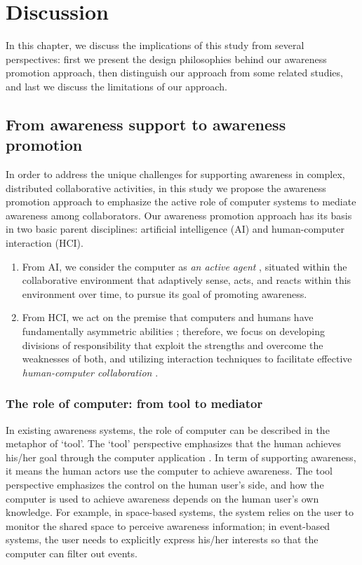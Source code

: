 \graphicspath{{Figures/}}

\chapter{Discussion} %
\label{cha:discussion}
In this chapter, we discuss the implications of this study from several perspectives: first we present the design philosophies behind our awareness promotion approach, then distinguish our approach from some related studies, and last we discuss the limitations of our approach.

\section{From awareness support to awareness promotion} %
\label{sec:from_awareness_support_to_awareness_promotion}
In order to address the unique challenges for supporting awareness in complex, distributed collaborative activities, in this study we propose the awareness promotion approach to emphasize the active role of computer systems to mediate awareness among collaborators. Our awareness promotion approach has its basis in two basic parent disciplines:  artificial intelligence (AI) and human-computer interaction (HCI). 
\begin{enumerate}
   \item From AI, we consider the computer as \emph{an active agent} \cite{Brown99activeuser}, situated within the collaborative environment that adaptively sense, acts, and reacts within this environment over time, to pursue its goal of promoting awareness.
   \item From HCI, we act on the premise that computers and humans have fundamentally asymmetric abilities \cite{Dalal1994}; therefore, we focus on developing divisions of responsibility that exploit the strengths and overcome the weaknesses of both, and utilizing interaction techniques to facilitate effective \emph{human-computer collaboration} \cite{Terveen1995}.
\end{enumerate}

\subsection{The role of computer: from tool to mediator} %
\label{sub:the_role_of_computer}
In existing awareness systems, the role of computer can be described in the metaphor of `tool'. The `tool' perspective emphasizes that the human achieves his/her goal through the computer application \cite{Bodker1997}. In term of supporting awareness, it means the human actors use the computer to achieve awareness. The tool perspective emphasizes the control on the human user's side, and how the computer is used to achieve awareness depends on the human user's own knowledge. For example, in space-based systems, the system relies on the user to monitor the shared space to perceive awareness information; in event-based systems, the user needs to explicitly express his/her interests so that the computer can filter out events. 

